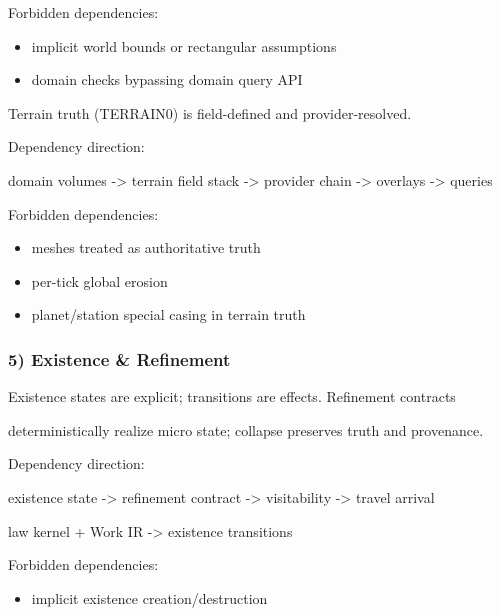 \documentclass[9pt,a4paper,openany]{book}
\begin{document}
Forbidden dependencies:

\begin{itemize}
\item implicit world bounds or rectangular assumptions
\item domain checks bypassing domain query API
\end{itemize}

Terrain truth (TERRAIN0) is field-\allowbreak{}defined and provider-\allowbreak{}resolved.\allowbreak{}


Dependency direction:

domain volumes -\allowbreak{}> terrain field stack -\allowbreak{}> provider chain -\allowbreak{}> overlays -\allowbreak{}> queries


Forbidden dependencies:

\begin{itemize}
\item meshes treated as authoritative truth
\item per-\allowbreak{}tick global erosion
\item planet/\allowbreak{}station special casing in terrain truth
\end{itemize}



\subsubsection{5) Existence \& Refinement}


Existence states are explicit; transitions are effects.\allowbreak{} Refinement contracts



deterministically realize micro state; collapse preserves truth and provenance.\allowbreak{}






Dependency direction:



existence state -\allowbreak{}> refinement contract -\allowbreak{}> visitability -\allowbreak{}> travel arrival



law kernel + Work IR -\allowbreak{}> existence transitions






Forbidden dependencies:



\begin{itemize}
\item implicit existence creation/\allowbreak{}destruction
\end{itemize}
\end{document}
